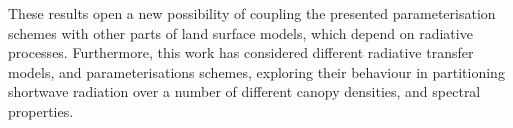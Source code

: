 \documentclass[a4paper,11pt]{report}
\begin{document}
These results open a new possibility of coupling the presented parameterisation schemes with other parts of land surface models, which depend on radiative processes. Furthermore, this work has considered different radiative transfer models, and parameterisations schemes, exploring their behaviour in partitioning shortwave radiation over a number of different canopy densities, and spectral properties. 




%

%

\newpage
\pagestyle{plain}


%
%
\end{document}
